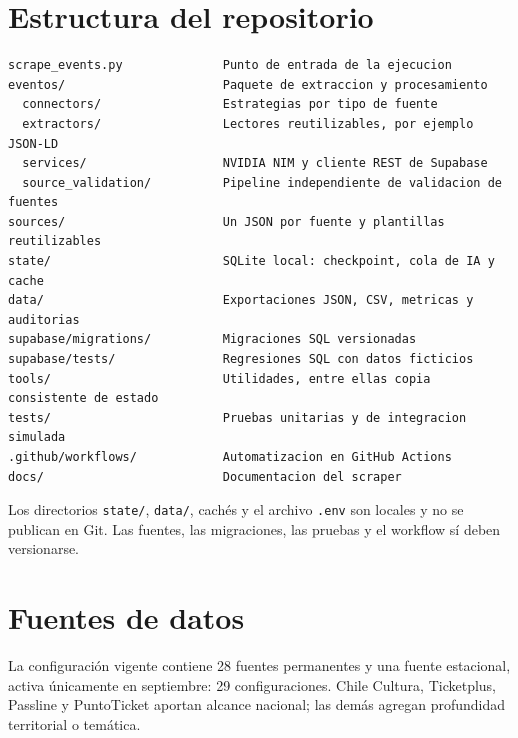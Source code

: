 \documentclass[11pt,a4paper]{article}
\begin{document}
\section{Estructura del repositorio}

\begin{lstlisting}
scrape_events.py              Punto de entrada de la ejecucion
eventos/                      Paquete de extraccion y procesamiento
  connectors/                 Estrategias por tipo de fuente
  extractors/                 Lectores reutilizables, por ejemplo JSON-LD
  services/                   NVIDIA NIM y cliente REST de Supabase
  source_validation/          Pipeline independiente de validacion de fuentes
sources/                      Un JSON por fuente y plantillas reutilizables
state/                        SQLite local: checkpoint, cola de IA y cache
data/                         Exportaciones JSON, CSV, metricas y auditorias
supabase/migrations/          Migraciones SQL versionadas
supabase/tests/               Regresiones SQL con datos ficticios
tools/                        Utilidades, entre ellas copia consistente de estado
tests/                        Pruebas unitarias y de integracion simulada
.github/workflows/            Automatizacion en GitHub Actions
docs/                         Documentacion del scraper
\end{lstlisting}

Los directorios \texttt{state/}, \texttt{data/}, cach\'{e}s y el archivo \texttt{.env} son locales y no se publican en Git. Las fuentes, las migraciones, las pruebas y el workflow s\'{i} deben versionarse.

\clearpage
\section{Fuentes de datos}

La configuraci\'{o}n vigente contiene 28 fuentes permanentes y una fuente estacional, activa \'{u}nicamente en septiembre: 29 configuraciones. Chile Cultura, Ticketplus, Passline y PuntoTicket aportan alcance nacional; las dem\'{a}s agregan profundidad territorial o tem\'{a}tica.
\end{document}
